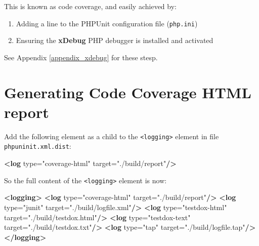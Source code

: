 \documentclass[a4paperpaper,openright]{book}
\newenvironment{Shaded}{}{}
\newcommand{\KeywordTok}[1]{\textcolor[rgb]{0.00,0.44,0.13}{\textbf{#1}}}
\newcommand{\OtherTok}[1]{\textcolor[rgb]{0.00,0.44,0.13}{#1}}
\newcommand{\StringTok}[1]{\textcolor[rgb]{0.25,0.44,0.63}{#1}}
\begin{document}
This is known as code coverage, and easily achieved by:

\begin{enumerate}
\def\labelenumi{\arabic{enumi}.}
\item
  Adding a line to the PHPUnit configuration file (\texttt{php.ini})
\item
  Ensuring the \textbf{xDebug} PHP debugger is installed and activated
\end{enumerate}

See Appendix \ref{appendix_xdebug} for these stesp.

\hypertarget{generating-code-coverage-html-report}{%
\section{Generating Code Coverage HTML
report}\label{generating-code-coverage-html-report}}

Add the following element as a child to the
\texttt{\textless{}logging\textgreater{}} element in file
\texttt{phpuninit.xml.dist}:

\begin{Shaded}
\begin{Highlighting}[]
        \KeywordTok{<log}\OtherTok{ type=}\StringTok{"coverage-html"}\OtherTok{ target=}\StringTok{"./build/report"}\KeywordTok{/>}
\end{Highlighting}
\end{Shaded}

So the full content of the \texttt{\textless{}logging\textgreater{}}
element is now:

\begin{Shaded}
\begin{Highlighting}[]
    \KeywordTok{<logging>}
        \KeywordTok{<log}\OtherTok{ type=}\StringTok{"coverage-html"}\OtherTok{ target=}\StringTok{"./build/report"}\KeywordTok{/>}
        \KeywordTok{<log}\OtherTok{ type=}\StringTok{"junit"}\OtherTok{ target=}\StringTok{"./build/logfile.xml"}\KeywordTok{/>}
        \KeywordTok{<log}\OtherTok{ type=}\StringTok{"testdox-html"}\OtherTok{ target=}\StringTok{"./build/testdox.html"}\KeywordTok{/>}
        \KeywordTok{<log}\OtherTok{ type=}\StringTok{"testdox-text"}\OtherTok{ target=}\StringTok{"./build/testdox.txt"}\KeywordTok{/>}
        \KeywordTok{<log}\OtherTok{ type=}\StringTok{"tap"}\OtherTok{ target=}\StringTok{"./build/logfile.tap"}\KeywordTok{/>}
    \KeywordTok{</logging>}
\end{Highlighting}
\end{Shaded}
\end{document}
